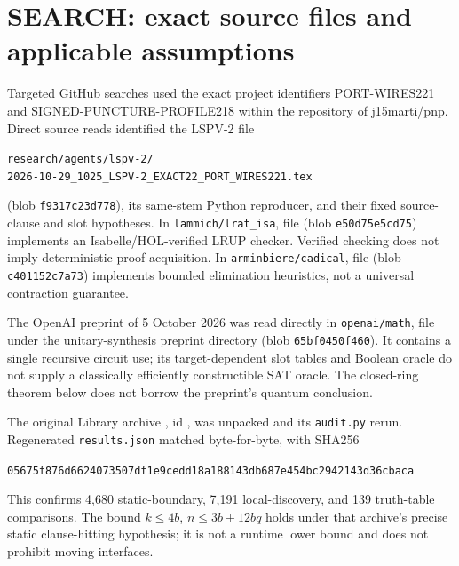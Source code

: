 \documentclass[11pt]{article}
\begin{document}
\section{SEARCH: exact source files and applicable assumptions}
Targeted GitHub searches used the exact project identifiers PORT-WIRES221 and SIGNED-PUNCTURE-PROFILE218 within the repository of j15marti/pnp. Direct source reads identified the LSPV-2 file
\begin{center}\footnotesize\texttt{research/agents/lspv-2/}\\\texttt{2026-10-29\_1025\_LSPV-2\_EXACT22\_PORT\_WIRES221.tex}\end{center}
(blob \texttt{f9317c23d778}), its same-stem Python reproducer, and their fixed source-clause and slot hypotheses. In \texttt{lammich/lrat\_isa}, file  (blob \texttt{e50d75e5cd75}) implements an Isabelle/HOL-verified LRUP checker. Verified checking does not imply deterministic proof acquisition. In \texttt{arminbiere/cadical}, file  (blob \texttt{c401152c7a73}) implements bounded elimination heuristics, not a universal contraction guarantee.

The OpenAI preprint of 5 October 2026 was read directly in \texttt{openai/math}, file  under the unitary-synthesis preprint directory (blob \texttt{65bf0450f460}). It contains a single recursive circuit use; its target-dependent slot tables and Boolean oracle do not supply a classically efficiently constructible SAT oracle. The closed-ring theorem below does not borrow the preprint's quantum conclusion.

The original Library archive , id , was unpacked and its \texttt{audit.py} rerun. Regenerated \texttt{results.json} matched byte-for-byte, with SHA256
\begin{center}\footnotesize\texttt{05675f876d6624073507df1e9cedd18a188143db687e454bc2942143d36cbaca}\end{center}
This confirms 4,680 static-boundary, 7,191 local-discovery, and 139 truth-table comparisons. The bound $k\le4b$, $n\le3b+12bq$ holds under that archive's precise static clause-hitting hypothesis; it is not a runtime lower bound and does not prohibit moving interfaces.
\end{document}
